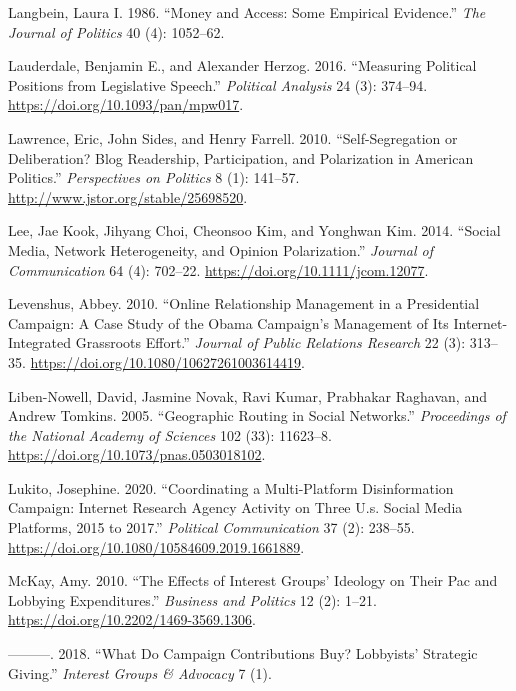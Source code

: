 \documentclass[12pt,]{article}
\begin{document}
\leavevmode\hypertarget{ref-langbein1986}{}%
Langbein, Laura I. 1986. ``Money and Access: Some Empirical Evidence.''
\emph{The Journal of Politics} 40 (4): 1052--62.

\leavevmode\hypertarget{ref-lauderdale2016}{}%
Lauderdale, Benjamin E., and Alexander Herzog. 2016. ``Measuring
Political Positions from Legislative Speech.'' \emph{Political Analysis}
24 (3): 374--94. \url{https://doi.org/10.1093/pan/mpw017}.

\leavevmode\hypertarget{ref-lawrence2010}{}%
Lawrence, Eric, John Sides, and Henry Farrell. 2010. ``Self-Segregation
or Deliberation? Blog Readership, Participation, and Polarization in
American Politics.'' \emph{Perspectives on Politics} 8 (1): 141--57.
\url{http://www.jstor.org/stable/25698520}.

\leavevmode\hypertarget{ref-lee2014}{}%
Lee, Jae Kook, Jihyang Choi, Cheonsoo Kim, and Yonghwan Kim. 2014.
``Social Media, Network Heterogeneity, and Opinion Polarization.''
\emph{Journal of Communication} 64 (4): 702--22.
\url{https://doi.org/10.1111/jcom.12077}.

\leavevmode\hypertarget{ref-levenshus2010}{}%
Levenshus, Abbey. 2010. ``Online Relationship Management in a
Presidential Campaign: A Case Study of the Obama Campaign's Management
of Its Internet-Integrated Grassroots Effort.'' \emph{Journal of Public
Relations Research} 22 (3): 313--35.
\url{https://doi.org/10.1080/10627261003614419}.

\leavevmode\hypertarget{ref-liben2005}{}%
Liben-Nowell, David, Jasmine Novak, Ravi Kumar, Prabhakar Raghavan, and
Andrew Tomkins. 2005. ``Geographic Routing in Social Networks.''
\emph{Proceedings of the National Academy of Sciences} 102 (33):
11623--8. \url{https://doi.org/10.1073/pnas.0503018102}.

\leavevmode\hypertarget{ref-lukito2020}{}%
Lukito, Josephine. 2020. ``Coordinating a Multi-Platform Disinformation
Campaign: Internet Research Agency Activity on Three U.s. Social Media
Platforms, 2015 to 2017.'' \emph{Political Communication} 37 (2):
238--55. \url{https://doi.org/10.1080/10584609.2019.1661889}.

\leavevmode\hypertarget{ref-mckay2010}{}%
McKay, Amy. 2010. ``The Effects of Interest Groups' Ideology on Their
Pac and Lobbying Expenditures.'' \emph{Business and Politics} 12 (2):
1--21. \url{https://doi.org/10.2202/1469-3569.1306}.

\leavevmode\hypertarget{ref-mckay2018}{}%
---------. 2018. ``What Do Campaign Contributions Buy? Lobbyists'
Strategic Giving.'' \emph{Interest Groups \& Advocacy} 7 (1).
\end{document}
